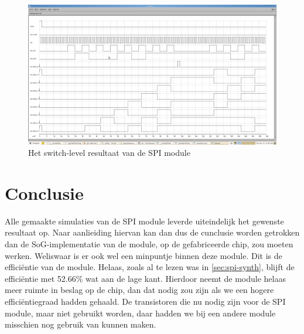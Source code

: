 \documentclass{scrartcl} %
\begin{document}
\begin{figure}[H]
	\centering
	\includegraphics[width=\textwidth]{resource/switchlevelSPI.png}
	\caption{Het switch-level resultaat van de SPI module}
	\label{fig:spi-sls}
\end{figure}

\section{Conclusie}
Alle gemaakte simulaties van de SPI module leverde uiteindelijk het gewenste resultaat op. Naar aanlieiding hiervan kan dan dus de cunclusie worden getrokken dan de SoG-implementatie van de module, op de gefabriceerde chip, zou moeten werken. Weliswaar is er ook wel een minpuntje binnen deze module. Dit is de effici\"entie van de module. Helaas, zoals al te lezen was in \ref{sec:spi-synth}, blijft de efficiëntie met 52.66\% wat aan de lage kant. Hierdoor neemt de module helaas meer ruimte in beslag op de chip, dan dat nodig zou zijn als we een hogere efficiëntiegraad hadden gehaald. De transistoren die nu nodig zijn voor de SPI module, maar niet gebruikt worden, daar hadden we bij een andere module misschien nog gebruik van kunnen maken. 
\end{document}
